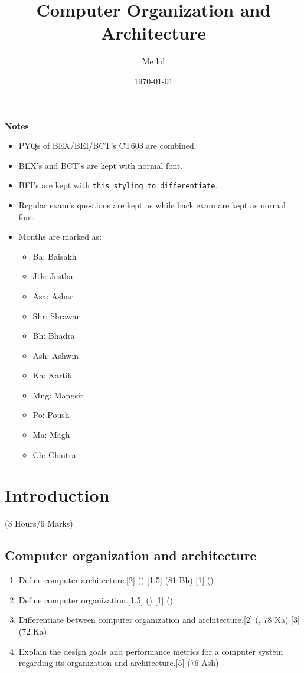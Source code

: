 \documentclass[12pt]{article}
\title{Computer Organization and Architecture}
\author{Me lol}
\date{\today}
\begin{document}
\maketitle

\vspace{8cm}
\begin{large}\textbf{Notes}\end{large}
\begin{itemize}
\item PYQs of BEX/BEI/BCT's CT603 are combined.
\item BEX's and BCT's are kept with normal font.\item BEI's are kept with \texttt{this styling to differentiate}.
\item Regular exam's questions are kept as  while back exam are kept as normal font.
\item Months are marked as: 
\begin{itemize}[noitemsep]
	\item Ba: Baisakh
	\item Jth: Jestha
	\item Asa: Ashar
	\item Shr: Shrawan
	\item Bh: Bhadra
	\item Ash: Ashwin
	\item Ka: Kartik
	\item Mng: Mangsir
	\item Po: Poush
	\item Ma: Magh
	\item Ch: Chaitra
\end{itemize}
\end{itemize}
\pagebreak

\tableofcontents
\pagebreak

\section{Introduction}
	\begin{center}(3 Hours/6 Marks)\end{center}
	\subsection{Computer organization and architecture}
	\begin{enumerate}[noitemsep, topsep = 0pt]
	\item Define computer architecture.\hfill[2] () [1.5] (81 Bh) [1] ()
	\item Define computer organization.\hfill[1.5] () [1] ()
	\item Differentiate between computer organization and architecture.\hfill[2] (, 78 Ka) [3] (72 Ka)
	\item Explain the design goals and performance metrics for a computer system regarding its organization and architecture.\hspace{9.9cm}[5] (76 Ash)
	\end{enumerate}
\end{document}
